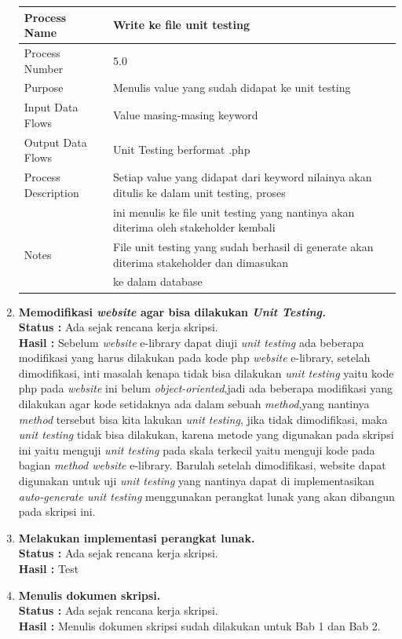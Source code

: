 \documentclass[a4paper,twoside]{article}
\begin{document}
\begin{enumerate}
\begin{center}
\begin{tabular}{ |l|l| } 
 \hline
 Process Name & Write ke file unit testing \\ 
 \hline
 Process Number & 5.0  \\ 
 \hline
 Purpose & Menulis value yang sudah didapat ke unit testing \\ 
 \hline
 Input Data Flows & Value masing-masing keyword \\
 \hline
 Output Data Flows & Unit Testing berformat .php \\
 \hline
 Process Description & Setiap value yang didapat dari keyword nilainya akan ditulis ke dalam unit testing, proses \\
 & ini menulis ke file unit testing yang nantinya akan diterima oleh stakeholder kembali\\
 \hline
 Notes & File unit testing yang sudah berhasil di generate akan diterima stakeholder dan dimasukan \\
 & ke dalam database\\
 \hline
\end{tabular}
\end{center}
		
\item \textbf{Memodifikasi \textit{website} agar bisa dilakukan \textit{Unit Testing.}}\\
\textbf{Status :} Ada sejak rencana kerja skripsi.\\
\textbf{Hasil :} Sebelum \textit{website} e-library dapat diuji \textit{unit testing} ada beberapa modifikasi yang harus dilakukan pada kode php \textit{website} e-library, setelah dimodifikasi, inti masalah kenapa tidak bisa dilakukan \textit{unit testing} yaitu kode php pada \textit{website} ini belum \textit{object-oriented},jadi ada beberapa modifikasi yang dilakukan agar kode setidaknya ada dalam sebuah \textit{method},yang nantinya \textit{method} tersebut bisa kita lakukan \textit{unit testing}, jika tidak dimodifikasi, maka \textit{unit testing} tidak bisa dilakukan, karena metode yang digunakan pada skripsi ini yaitu menguji \textit{unit testing} pada skala terkecil yaitu menguji kode pada bagian \textit{method website} e-library. Barulah setelah dimodifikasi, website dapat digunakan untuk uji \textit{unit testing} yang nantinya dapat di implementasikan \textit{auto-generate unit testing} menggunakan perangkat lunak yang akan dibangun pada skripsi ini.

\item \textbf{Melakukan implementasi perangkat lunak.}\\
\textbf{Status :} Ada sejak rencana kerja skripsi.\\
\textbf{Hasil :} Test

		\item \textbf{Menulis dokumen skripsi.}\\
		{\bf Status :} Ada sejak rencana kerja skripsi.\\
		{\bf Hasil :} Menulis dokumen skripsi sudah dilakukan untuk Bab 1 dan Bab 2.

	\end{enumerate}
\end{document}
